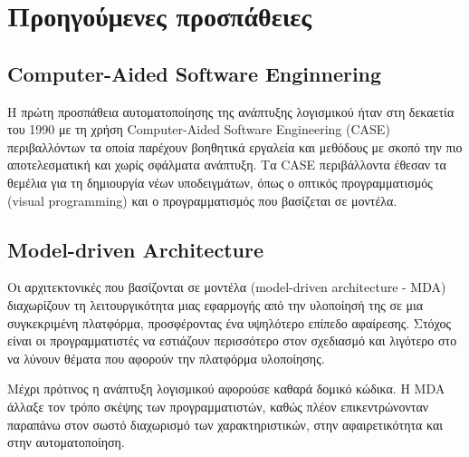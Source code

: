     \section{Προηγούμενες προσπάθειες}
        \subsection{Computer-Aided Software Enginnering}
        Η πρώτη προσπάθεια αυτοματοποίησης της ανάπτυξης λογισμικού ήταν στη δεκαετία του 1990 με τη χρήση Computer-Aided Software Engineering (CASE) περιβαλλόντων
            τα οποία παρέχουν βοηθητικά εργαλεία και μεθόδους με σκοπό την πιο αποτελεσματική και χωρίς σφάλματα ανάπτυξη.
        Τα CASE περιβάλλοντα έθεσαν τα θεμέλια για τη δημιουργία νέων υποδειγμάτων, όπως ο οπτικός προγραμματισμός (visual programming) και ο προγραμματισμός που βασίζεται σε μοντέλα. \cite{Case1985}

        \subsection{Model-driven Architecture}
        Οι αρχιτεκτονικές που βασίζονται σε μοντέλα (model-driven architecture - MDA) διαχωρίζουν τη λειτουργικότητα μιας εφαρμογής από την υλοποίησή της σε μια συγκεκριμένη πλατφόρμα, προσφέροντας ένα υψηλότερο επίπεδο αφαίρεσης.
        Στόχος είναι οι προγραμματιστές να εστιάζουν περισσότερο στον σχεδιασμό και λιγότερο στο να λύνουν θέματα που αφορούν την πλατφόρμα υλοποίησης.

        Μέχρι πρότινος η ανάπτυξη λογισμικού αφορούσε καθαρά δομικό κώδικα.
        Η MDA άλλαξε τον τρόπο σκέψης των προγραμματιστών, καθώς πλέον επικεντρώνονταν παραπάνω στον σωστό διαχωρισμό των χαρακτηριστικών, στην αφαιρετικότητα και στην αυτοματοποίηση. \cite{MDAFAQ} \cite{Bucaioni2022}
